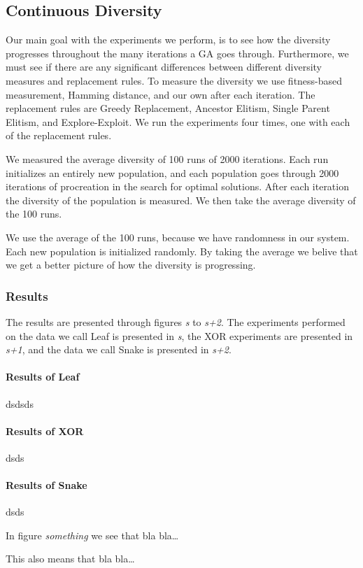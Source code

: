 \subsection{Continuous Diversity}
\label{sec:continuousdiversity}

Our main goal with the experiments we perform, is to see how the diversity progresses throughout the many iterations a GA goes through. Furthermore, we must see if there are any significant differences between different diversity measures and replacement rules. To measure the diversity we use fitness-based measurement, Hamming distance, and our own \dia{} after each iteration. The replacement rules are Greedy Replacement, Ancestor Elitism, Single Parent Elitism, and Explore-Exploit. We run the experiments four times, one with each of the replacement rules.

We measured the average diversity of \num{100} runs of \num{2000} iterations. Each run initializes an entirely new population, and each population goes through \num{2000} iterations of procreation in the search for optimal solutions. After each iteration the diversity of the population is measured. We then take the average diversity of the \num{100} runs. %

We use the average of the \num{100} runs, because we have randomness in our system. Each new population is initialized randomly. By taking the average we belive that we get a better picture of how the diversity is progressing.

\subsubsection{Results}
The results are presented through figures \emph{s} to \emph{s+2}. The experiments performed on the data we call Leaf is presented in \emph{s}, the XOR experiments are presented in \emph{s+1}, and the data we call Snake is presented in \emph{s+2}.

\paragraph{Results of Leaf} dsdsds

\paragraph{Results of XOR} dsds

\paragraph{Results of Snake} dsds

In figure \emph{something} we see that bla bla\dots

This also means that bla bla\dots

